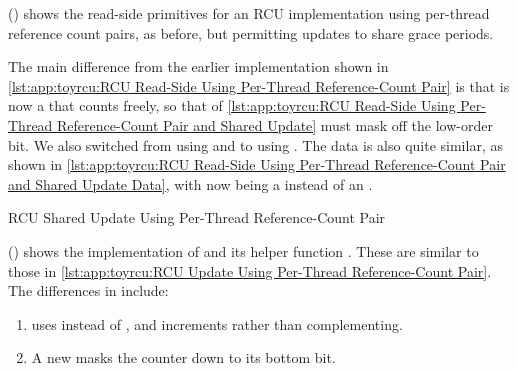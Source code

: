 ()
shows the read-side primitives for an RCU implementation using per-thread
reference count pairs, as before, but permitting updates to share
grace periods.
\begin{lineref}
The main difference from the earlier implementation shown in
\cref{lst:app:toyrcu:RCU Read-Side Using Per-Thread Reference-Count Pair}
is that  is now a  that counts freely,
so that  of
\cref{lst:app:toyrcu:RCU Read-Side Using Per-Thread Reference-Count Pair and Shared Update}
must mask off the low-order bit.
We also switched from using  and 
to using .
The data is also quite similar, as shown in
\cref{lst:app:toyrcu:RCU Read-Side Using Per-Thread Reference-Count Pair and Shared Update Data},
with  now being a  instead of an
.
\end{lineref}

\begin{listing}[tbp]

\caption{RCU Shared Update Using Per-Thread Reference-Count Pair}
\label{lst:app:toyrcu:RCU Shared Update Using Per-Thread Reference-Count Pair}
\end{listing}

()
shows the implementation of  and its helper
function .
These are similar to those in
\cref{lst:app:toyrcu:RCU Update Using Per-Thread Reference-Count Pair}.
The differences in  include:
\begin{lineref}
\begin{enumerate}
\item	{} uses  instead of ,
	and increments rather than complementing.
\item	A new  masks the counter down to its bottom bit.
\end{enumerate}
\end{lineref}

